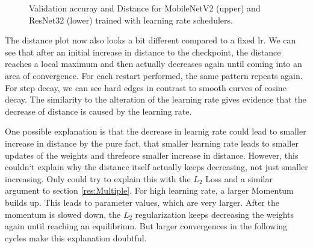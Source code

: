 \begin{figure}[h]
\begin{center}
        \caption{Validation accuray and Distance for MobileNetV2 (upper) and ResNet32 (lower) trained with learning rate schedulers.}
    \end{center}
\end{figure}


The distance plot now also looks a bit different compared to a fixed lr. We can
see that after an initial increase in distance to the checkpoint, the distance
reaches a local maximum and then actually decreases again until coming into an
area of convergence. For each restart performed, the same pattern repeats again.
For step decay, we can see hard edges in contrast to smooth curves of cosine
decay. The similarity to the alteration of the learning rate gives evidence that
the decrease of distance is caused by the learning rate. 

One possible explanation is that the decrease in learnig rate could lead to
smaller increase in distance by the pure fact, that smaller learning rate leads
to smaller updates of the weights and threfeore smaller increase in distance.
However, this couldn`t explain why the distance itself actually keeps
decreasing, not just smaller increasing. Only could try to explain this with the
$L_2$ Loss and a similar argument to section \ref{res:Multiple}. For high
learning rate, a larger Momentum builds up. This leads to parameter values,
which are very larger. After the momentum is slowed down, the $L_2$
regularization keeps decreasing the weights again until reaching an equilibrium.
But larger convergences in the following cycles make this explanation doubtful. 

\begin{comment}
Another idea could relate to the wedges. If we enter a wedge, it might be
possible that we end up on a circular path around the checkpoint. This might
lead to a valley which decreases the distance again. For large learning rate, we
can just jump between those valley, but for small learnig rates, we just follow
these valleys.
\end{comment}

